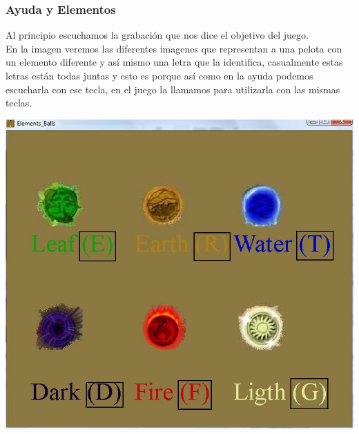 \documentclass[10pt]{article}
\begin{document}
{\begin{flushleft}
\subsubsection{Ayuda y Elementos}
Al principio escuchamos la grabaci\'on que nos dice el objetivo del juego.\\
En la imagen veremos las diferentes imagenes que representan a una pelota con un elemento diferente y as\'i mismo una letra que la identifica, casualmente estas letras est\'an todas juntas y esto es porque as\'i como en la ayuda podemos escucharla con ese tecla, en el juego la llamamos para utilizarla con las mismas teclas.
\begin{center}
\includegraphics[scale=0.7]{ayudaEle}
\end{center}


\end{flushleft}}
\end{document}
